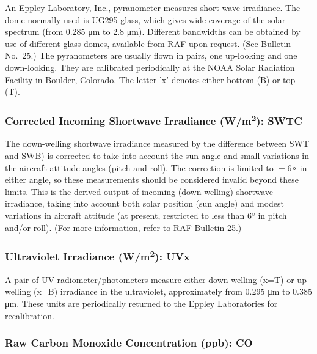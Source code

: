 \documentclass[
]{book}
\begin{document}
An Eppley Laboratory, Inc., pyranometer measures short-wave irradiance. The dome normally used is UG295 glass, which gives wide coverage of the solar spectrum (from 0.285 {μm} to 2.8 {μm}). Different bandwidths can be obtained by use of different glass domes, available from RAF upon request. (See Bulletin No.~25.) The pyranometers are usually flown in pairs, one up-looking and one down-looking. They are calibrated periodically at the NOAA Solar Radiation Facility in Boulder, Colorado. The letter 'x' denotes either bottom (B) or top (T).

\hypertarget{swtc}{%
\subsubsection*{\texorpdfstring{Corrected Incoming Shortwave Irradiance (W/m\textsuperscript{2}): SWTC}{Corrected Incoming Shortwave Irradiance (W/m2): SWTC}}\label{swtc}}

The down-welling shortwave irradiance measured by the difference between SWT and SWB) is corrected to take into account the sun angle and small variations in the aircraft attitude angles (pitch and roll). The correction is limited to { ± 6∘} in either angle, so these measurements should be considered invalid beyond these limits. This is the derived output of incoming (down-welling) shortwave irradiance, taking into account both solar position (sun angle) and modest variations in aircraft attitude (at present, restricted to less than 6{º} in pitch and/or roll). (For more information, refer to RAF Bulletin 25.)

\hypertarget{uvx}{%
\subsubsection*{\texorpdfstring{Ultraviolet Irradiance (W/m\textsuperscript{2}): UVx}{Ultraviolet Irradiance (W/m2): UVx}}\label{uvx}}

A pair of UV radiometer/photometers measure either down-welling (x=T) or up-welling (x=B) irradiance in the ultraviolet, approximately from 0.295 {μm} to 0.385 {μm}. These units are periodically returned to the Eppley Laboratories for recalibration.

\hypertarget{co}{%
\subsubsection*{Raw Carbon Monoxide Concentration (ppb): CO}\label{co}}
\end{document}
